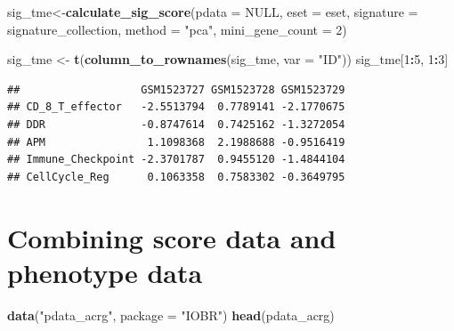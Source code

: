\documentclass[
  12pt,
]{book}
\newenvironment{Shaded}{\begin{snugshade}}{\end{snugshade}}
\newcommand{\AttributeTok}[1]{\textcolor[rgb]{0.13,0.29,0.53}{#1}}
\newcommand{\ConstantTok}[1]{\textcolor[rgb]{0.56,0.35,0.01}{#1}}
\newcommand{\DecValTok}[1]{\textcolor[rgb]{0.00,0.00,0.81}{#1}}
\newcommand{\FunctionTok}[1]{\textcolor[rgb]{0.13,0.29,0.53}{\textbf{#1}}}
\newcommand{\NormalTok}[1]{#1}
\newcommand{\OtherTok}[1]{\textcolor[rgb]{0.56,0.35,0.01}{#1}}
\newcommand{\SpecialCharTok}[1]{\textcolor[rgb]{0.81,0.36,0.00}{\textbf{#1}}}
\newcommand{\StringTok}[1]{\textcolor[rgb]{0.31,0.60,0.02}{#1}}
\begin{document}
\begin{Shaded}
\begin{Highlighting}[]
\NormalTok{sig\_tme}\OtherTok{\textless{}{-}}\FunctionTok{calculate\_sig\_score}\NormalTok{(}\AttributeTok{pdata           =} \ConstantTok{NULL}\NormalTok{,}
                             \AttributeTok{eset            =}\NormalTok{ eset,}
                             \AttributeTok{signature       =}\NormalTok{ signature\_collection,}
                             \AttributeTok{method          =} \StringTok{"pca"}\NormalTok{,}
                             \AttributeTok{mini\_gene\_count =} \DecValTok{2}\NormalTok{)}

\NormalTok{sig\_tme }\OtherTok{\textless{}{-}} \FunctionTok{t}\NormalTok{(}\FunctionTok{column\_to\_rownames}\NormalTok{(sig\_tme, }\AttributeTok{var =} \StringTok{"ID"}\NormalTok{))}
\NormalTok{sig\_tme[}\DecValTok{1}\SpecialCharTok{:}\DecValTok{5}\NormalTok{, }\DecValTok{1}\SpecialCharTok{:}\DecValTok{3}\NormalTok{]}
\end{Highlighting}
\end{Shaded}

\begin{verbatim}
##                   GSM1523727 GSM1523728 GSM1523729
## CD_8_T_effector   -2.5513794  0.7789141 -2.1770675
## DDR               -0.8747614  0.7425162 -1.3272054
## APM                1.1098368  2.1988688 -0.9516419
## Immune_Checkpoint -2.3701787  0.9455120 -1.4844104
## CellCycle_Reg      0.1063358  0.7583302 -0.3649795
\end{verbatim}

\hypertarget{combining-score-data-and-phenotype-data}{%
\section{Combining score data and phenotype data}\label{combining-score-data-and-phenotype-data}}

\begin{Shaded}
\begin{Highlighting}[]
\FunctionTok{data}\NormalTok{(}\StringTok{"pdata\_acrg"}\NormalTok{, }\AttributeTok{package =} \StringTok{"IOBR"}\NormalTok{)}
\FunctionTok{head}\NormalTok{(pdata\_acrg)}
\end{Highlighting}
\end{Shaded}
\end{document}

